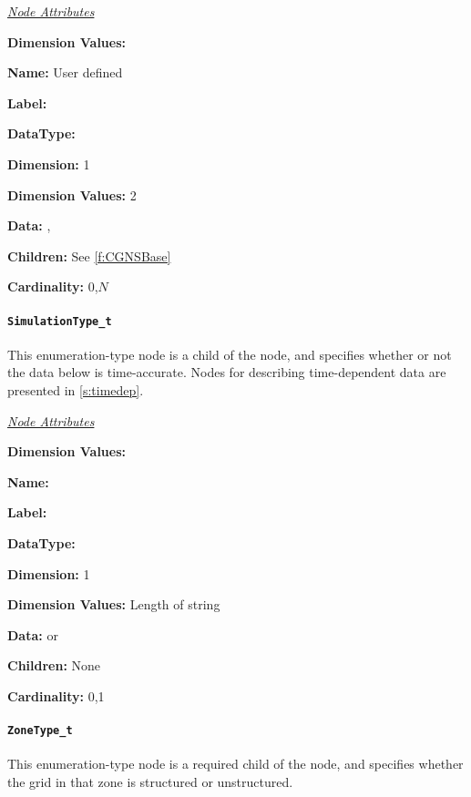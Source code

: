 \textit{\uline{Node Attributes}}
\begin{Ventryic}{\textbf{Dimension Values:}}
\item [\textbf{Name:}]
      User defined
\item [\textbf{Label:}]
\item [\textbf{DataType:}]
\item [\textbf{Dimension:}]
      1
\item [\textbf{Dimension Values:}]
      2
\item [\textbf{Data:}]
      , 
\item [\textbf{Children:}]
      See \autoref{f:CGNSBase}
\item [\textbf{Cardinality:}]
      0,$N$
\end{Ventryic}

\paragraph{\texttt{SimulationType\_t}}

This enumeration-type node is a child of the  node,
and specifies whether or not the data below  is
time-accurate.
Nodes for describing time-dependent data are presented in
\autoref{s:timedep}.

\textit{\uline{Node Attributes}}
\begin{Ventryic}{\textbf{Dimension Values:}}
\item [\textbf{Name:}]
\item [\textbf{Label:}]
\item [\textbf{DataType:}]
\item [\textbf{Dimension:}]
      1
\item [\textbf{Dimension Values:}]
      Length of string
\item [\textbf{Data:}]
       or 
\item [\textbf{Children:}]
      None
\item [\textbf{Cardinality:}]
      0,1
\end{Ventryic}

\paragraph{\texttt{ZoneType\_t}}

This enumeration-type node is a required child of the 
node, and specifies whether the grid in that zone is structured or
unstructured.

